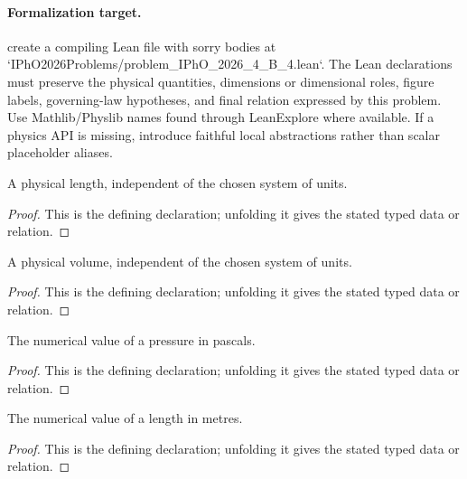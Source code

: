 \paragraph{Formalization target.}
create a compiling Lean file with sorry bodies at `IPhO2026Problems/problem\_IPhO\_2026\_4\_B\_4.lean`. The Lean declarations must preserve the physical quantities, dimensions or dimensional roles, figure labels, governing-law hypotheses, and final relation expressed by this problem.
Use Mathlib/Physlib names found through LeanExplore where available. If a physics API is missing, introduce faithful local abstractions rather than scalar placeholder aliases.

\begin{definition}[DimLength]
  \label{decl:physics:IPhO_2026_4_B_4:DimLength}
  A physical length, independent of the chosen system of units.
\end{definition}
\begin{proof}
  This is the defining declaration; unfolding it gives the stated typed data or relation.
\end{proof}

\begin{definition}[DimVolume]
  \label{decl:physics:IPhO_2026_4_B_4:DimVolume}
  A physical volume, independent of the chosen system of units.
\end{definition}
\begin{proof}
  This is the defining declaration; unfolding it gives the stated typed data or relation.
\end{proof}

\begin{definition}[pressureInPascals]
  \label{decl:physics:IPhO_2026_4_B_4:pressureInPascals}
  The numerical value of a pressure in pascals.
\end{definition}
\begin{proof}
  This is the defining declaration; unfolding it gives the stated typed data or relation.
\end{proof}

\begin{definition}[lengthInMeters]
  \label{decl:physics:IPhO_2026_4_B_4:lengthInMeters}
  The numerical value of a length in metres.
\end{definition}
\begin{proof}
  This is the defining declaration; unfolding it gives the stated typed data or relation.
\end{proof}

